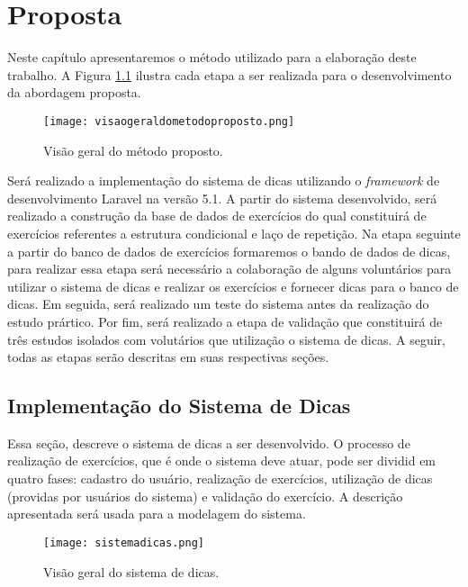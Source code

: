 \chapter{Proposta}

Neste capítulo apresentaremos o método utilizado para a elaboração deste trabalho. A Figura \ref{figura:visaometodo} ilustra cada etapa a ser realizada para o desenvolvimento da abordagem proposta.

\begin{figure}[h]
	\centering
	\texttt{[image: visaogeraldometodoproposto.png]}
	\caption{Visão geral do método proposto.}
	\label{figura:visaometodo}
\end{figure}

Será realizado a implementação do sistema de dicas utilizando o \textit{framework} de desenvolvimento Laravel na versão 5.1. A partir do sistema desenvolvido, será realizado a construção da base de dados de exercícios do qual constituirá de exercícios referentes a estrutura condicional e laço de repetição. Na etapa seguinte a partir do banco de dados de exercícios formaremos o bando de dados de dicas, para realizar essa etapa será necessário a colaboração de alguns voluntários para utilizar o sistema de dicas e realizar os exercícios e fornecer dicas para o banco de dicas. Em seguida, será realizado um teste do sistema antes da realização do estudo prártico. Por fim, será realizado a etapa de validação que constituirá de três estudos isolados com volutários que utilização o sistema de dicas. A seguir, todas as etapas serão descritas em
suas respectivas seções.

\section{Implementação do Sistema de Dicas}

Essa seção, descreve o sistema de dicas a ser desenvolvido. O processo de realização de exercícios, que é onde o sistema deve atuar, pode ser dividid em quatro fases: cadastro do usuário, realização de exercícios, utilização de dicas (providas por usuários do sistema) e validação do exercício. A descrição apresentada será usada para a modelagem do sistema.

\begin{figure}[h]
	\centering
	\texttt{[image: sistemadicas.png]}
	\caption{Visão geral do sistema de dicas.}
	\label{figura:sistemadicas}
\end{figure}

